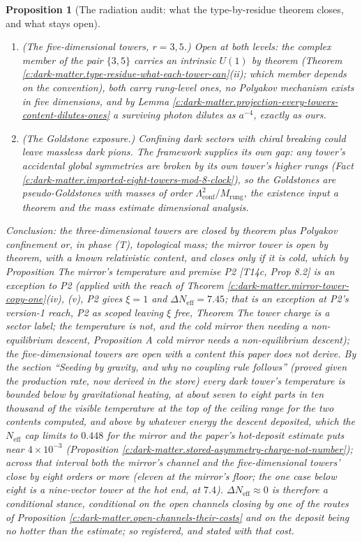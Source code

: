 \documentclass[11pt]{article}
\newtheorem{proposition}[theorem]{Proposition}
\theoremstyle{definition}
\theoremstyle{plain}
\providecommand{\Neff}{}\renewcommand{\Neff}{N_{\mathrm{eff}}}
\begin{document}
\begin{proposition}[The radiation audit: what the type-by-residue theorem closes, and what stays open]
\begin{enumerate}
\item \emph{(The five-dimensional towers, $r = 3, 5$.)} Open at both levels: the complex member of the pair $\{3, 5\}$ carries an intrinsic $U(1)$ by theorem (Theorem \ref{c:dark-matter.type-residue-what-each-tower-can}(ii); which member depends on the convention), both carry rung-level ones, no Polyakov mechanism exists in five dimensions, and by Lemma \ref{c:dark-matter.projection-every-towers-content-dilutes-ones} a surviving photon dilutes as $a^{-4}$, exactly as ours.
\item \emph{(The Goldstone exposure.)} Confining dark sectors with chiral breaking could leave massless dark pions. The framework supplies its own gap: any tower's accidental global symmetries are broken by its own tower's higher rungs (Fact \ref{c:dark-matter.imported-eight-towers-mod-8-clock}), so the Goldstones are pseudo-Goldstones with masses of order $\Lambda_{\mathrm{conf}}^{2}/M_{\mathrm{rung}}$, the existence input a theorem and the mass estimate dimensional analysis.
\end{enumerate}
Conclusion: the three-dimensional towers are closed by theorem plus Polyakov confinement or, in phase (T), topological mass; the mirror tower is open by theorem, with a known relativistic content, and closes only if it is cold, which by Proposition \emph{The mirror's temperature and premise P2} [T14c, Prop 8.2] is an exception to P2 (applied with the reach of Theorem \ref{c:dark-matter.mirror-tower-copy-one}(iv), (v), P2 gives $\xi = 1$ and $\Delta\Neff = 7.45$; that is an exception at P2's version-1 reach, P2 as scoped leaving $\xi$ free, Theorem \emph{The tower charge is a sector label; the temperature is not}, and the cold mirror then needing a non-equilibrium descent, Proposition \emph{A cold mirror needs a non-equilibrium descent}); the five-dimensional towers are open with a content this paper does not derive. By the section ``Seeding by gravity, and why no coupling rule follows'' (proved given the production rate, now derived in the store) every dark tower's temperature is bounded below by gravitational heating, at about seven to eight parts in ten thousand of the visible temperature at the top of the ceiling range for the two contents computed, and above by whatever energy the descent deposited, which the $\Neff$ cap limits to $0.448$ for the mirror and the paper's hot-deposit estimate puts near $4 \times 10^{-3}$ (Proposition \ref{c:dark-matter.stored-asymmetry-charge-not-number}); across that interval both the mirror's channel and the five-dimensional towers' close by eight orders or more (eleven at the mirror's floor; the one case below eight is a nine-vector tower at the hot end, at $7.4$). $\Delta\Neff \approx 0$ is therefore a conditional stance, conditional on the open channels closing by one of the routes of Proposition \ref{c:dark-matter.open-channels-their-costs} and on the deposit being no hotter than the estimate; so registered, and stated with that cost.


\end{proposition}
\end{document}
